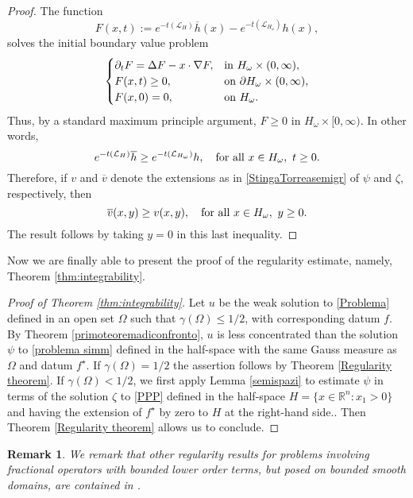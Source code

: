 \documentclass[a4paper,10pt,reqno]{amsart}
\newtheorem{remark}[theorem]{Remark}
\numberwithin{equation}{section}
\begin{document}
\begin{proof}
The function
\[
F(x,t):=e^{-t(\mathcal{L}_{H})}\overline{h}(x)-e^{-t(\mathcal{L}_{H_{\omega}})}h(x),
\]
solves the initial boundary value problem
$$\begin{cases}
\partial_tF=\Delta F-x\cdot\nabla F,&\hbox{in}~H_\omega\times(0,\infty), \\
F(x,t)\geq0,&\hbox{on}~\partial H_{\omega}\times(0,\infty), \\
F(x,0)=0,&\hbox{on}~H_{\omega}.\\
\end{cases}$$
Thus, by a standard maximum principle argument, $F\geq0$ in $H_{\omega}\times[0,\infty)$.
In other words,
$$e^{-t(\mathcal{L}_{H})}\overline{h}\geq e^{-t(\mathcal{L}_{H_{\omega}})}h,\quad
\hbox{for all}~x\in H_{\omega},~t\geq0.$$
Therefore, if $v$ and $\overline{v}$ denote the extensions as in
\eqref{StingaTorreasemigr} of $\psi$ and $\zeta$, respectively, then
$$\overline{v}(x,y)\geq v(x,y),\quad\hbox{for all}~x\in H_{\omega},~y\geq0.$$
The result follows by taking $y=0$ in this last inequality.
\end{proof}

Now we are finally able to present the proof of the regularity estimate, namely, Theorem \ref{thm:integrability}.

\begin{proof}[Proof of Theorem \ref{thm:integrability}]
Let $u$ be the weak solution to \eqref{Problema} defined in an open set $\Omega$
such that $\gamma(\Omega)\leq 1/2$, with corresponding datum $f$. By Theorem
\ref{primoteoremadiconfronto}, $u$ is less concentrated than the solution $\psi$ to \eqref{problema simm} defined in the half-space with the
same Gauss measure as $\Omega$ and datum $f^{\displaystyle\star}$. If $\gamma(\Omega)=1/2$ the assertion follows by Theorem \ref{Regularity theorem}. If
$\gamma(\Omega)<1/2$,
we first apply Lemma \ref{semispazi} to estimate $\psi$ in terms of the solution $\zeta$ to \eqref{PPP} defined in the
half-space $H=\{x\in\mathbf{\mathbb{R}}^{n}:x_{1}>0\}$ and having the extension of
$f^{\displaystyle\star}$ by zero to $H$ at the right-hand side.. Then Theorem \ref{Regularity theorem} allows us to conclude.
\end{proof}

\begin{remark}
We remark that other regularity results for problems involving fractional operators with bounded lower order terms,
but posed on bounded smooth domains, are contained in \cite{Grubb}.
\end{remark}
\end{document}
